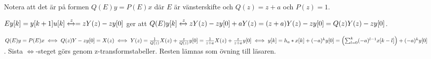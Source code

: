 \documentclass[a4paper]{article}
\begin{document}
Notera att det är på formen \(
    Q(E)y = P(E)x
\) där \(
    E 
\) är vänsterskifte och \(
    Q(z) = z + a
\) och \(
    P(z) = 1
\).

\(
    Ey[k] = y[k+1]u[k] \xleftrightarrow{z} = z Y(z)-zy[0]
\) ger att \(
    Q(E)y[k] \xleftrightarrow{z} z Y(z) - zy[0] + a Y(z)
        = (z+a)Y(z)-zy[0]
        = Q(z)Y(z)-zy[0]
\).

\(
    Q(E)y = P(E)x 
        \iff Q(z)Y - zy[0] = X(z)
        \iff Y(z) = \frac{1}{Q(z)} X(z) + \frac{z}{Q(z)} y[0]
            = \frac{1}{z+a} X(z) + \frac{z}{z+a} y[0]
        \iff y[k] = h_a*x[k] + (-a)^k y[0]
            = \left(\sum_{l=0}^k (-a)^{l-1} x[k-l]\right) + (-a)^k y[0]
\). Sista \(
    \iff
\)-steget görs genom z-transformstabeller. 
Resten lämnas som övning till läsaren.
\end{document}
